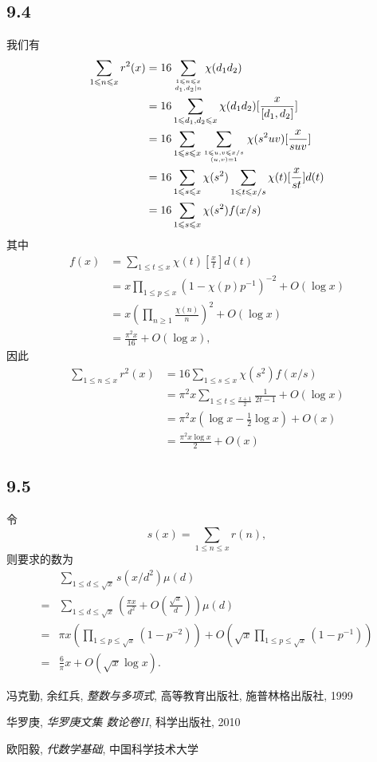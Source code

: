 \documentclass[12pt,a4paper,reqno]{amsart}
\theoremstyle{remark}
\renewcommand{\le}{\leqslant}
\renewcommand{\ge}{\geqslant}
\begin{document}
\subsection*{9.4}
我们有
\[\begin{split}
  \sum_{1\le n\le x} r^2(x)&=16\sum_{1\le n\le x\atop d_1,d_2\mid n} \chi(d_1d_2)\\
  &=16\sum_{1\le d_1,d_2\le x}\chi(d_1d_2)[\frac{x}{[d_1,d_2]}]\\
  &=16\sum_{1\le s\le x}\sum_{1\le u,v\le x/s\atop (u,v)=1} \chi(s^2uv)[\frac{x}{suv}]\\
  &=16\sum_{1\le s\le x}\chi(s^2) \sum_{1\le t\le x/s} \chi(t)[\frac{x}{st}]d(t)\\
  &=16\sum_{1\le s\le x}\chi(s^2)f(x/s)
\end{split}\]
其中
\[\begin{split}
  f(x)&=\sum_{1\le t\le x} \chi(t)[\frac{x}{t}]d(t)\\
  &=x\prod_{1\le p\le x}(1-\chi(p)p^{-1})^{-2}+O(\log x)\\
  &=x(\prod_{n\ge 1}\frac{\chi(n)}{n})^2+O(\log x)\\
  &=\frac{\pi^2 x}{16}+O(\log x),
\end{split}\]
因此
\[\begin{split}
  \sum_{1\le n\le x} r^2(x)&=16\sum_{1\le s\le x}\chi(s^2)f(x/s)\\
  &=\pi^2 x\sum_{1\le t\le \frac{x+1}{2}}\frac{1}{2t-1}+O(\log x)\\
  &=\pi^2 x(\log x-\frac{1}{2}\log x)+O(x)\\
  &=\frac{\pi^2 x\log x}{2}+O(x)
\end{split}\]

\subsection*{9.5}
令 \[s(x)=\sum_{1\le n\le x}r(n),\]
则要求的数为
 \[\begin{split}
    &\sum_{1\le d\le \sqrt{x}} s(x/d^2)\mu(d)\\
   =&\sum_{1\le d\le \sqrt{x}} (\frac{\pi x}{d^2}+O(\frac{\sqrt{x}}{d}))\mu(d)\\
   =&\pi x(\prod_{1\le p\le \sqrt{x}}(1-p^{-2}))+O(\sqrt{x}\prod_{1\le p\le \sqrt{x}}(1-p^{-1}))\\
   =&\frac{6}{\pi} x+O(\sqrt{x}\log x).
 \end{split}\]
  






\vspace{0.4cm}
\begin{thebibliography}{999}
冯克勤, 余红兵, \emph{整数与多项式}, 高等教育出版社, 施普林格出版社, 1999

华罗庚, \emph{华罗庚文集 数论卷II}, 科学出版社, 2010

欧阳毅, \emph{代数学基础}, 中国科学技术大学
\end{thebibliography}
\end{document}
